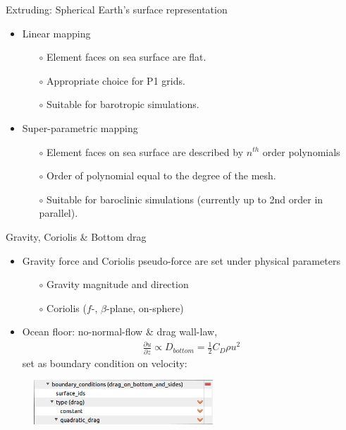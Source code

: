 \documentclass[t]{beamer}
\begin{document}
\begin{frame}{Extruding: Spherical Earth's surface representation}
\begin{itemize}
  \item Linear mapping
  \begin{itemize}
    \item[$\circ$] Element faces on sea surface are flat.
    \item[$\circ$] Appropriate choice for P1 grids.
    \item[$\circ$] Suitable for barotropic simulations.
  \end{itemize}
  \item Super-parametric mapping
  \begin{itemize}
    \item[$\circ$] Element faces on sea surface are described by $n^{th}$ order polynomials
    \item[$\circ$] Order of polynomial equal to the degree of the mesh.
    \item[$\circ$] Suitable for baroclinic simulations (currently up to 2nd order in parallel).
  \end{itemize}
\end{itemize}

\end{frame}

\begin{frame}{Gravity, Coriolis \& Bottom drag}
\begin{itemize}
  \item Gravity force and Coriolis pseudo-force are set under physical parameters
  \begin{itemize}
    \item[$\circ$] Gravity magnitude and direction
    \item[$\circ$] Coriolis ($f$-, $\beta$-plane, on-sphere)
  \end{itemize}
  \item Ocean floor: no-normal-flow \& drag wall-law,
  \begin{align*}
  \frac{\partial u}{\partial z} \propto D_{bottom} = \frac{1}{2} C_D \rho u^{2}
  \end{align*}
  set as boundary condition on velocity:
\end{itemize}
\begin{figure}[htbp!]
 \centering
  \includegraphics[width=0.6\textwidth]{figures/bottom_drag}
\end{figure}
\end{frame}
\end{document}
